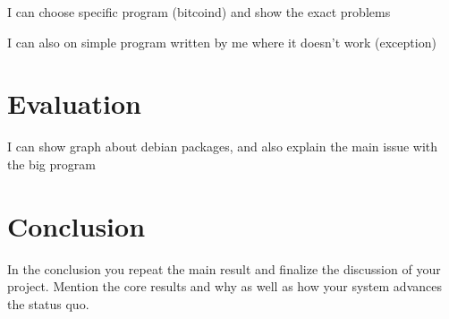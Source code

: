 \documentclass[a4paper,11pt,oneside]{report}
\begin{document}
I can choose specific program (bitcoind) and show the exact problems

I can also on simple program written by me where it
doesn't work (exception)



\chapter{Evaluation}
I can show graph about debian packages, and also explain the main issue with the big program



%



\chapter{Conclusion}

In the conclusion you repeat the main result and finalize the discussion of
your project. Mention the core results and why as well as how your system
advances the status quo.

\cleardoublepage
{}
{}
\printbibliography

%
%
\end{document}
